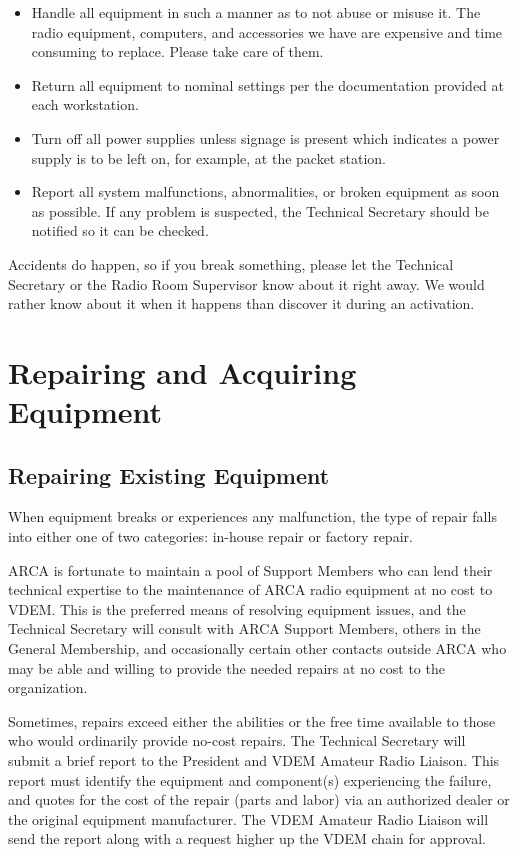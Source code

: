 \documentclass[pdflatex,letterpaper,twoside,12pt]{book}
\begin{document}
\begin{itemize}
	\item Handle all equipment in such a manner as to not abuse or misuse it.  The radio equipment, computers, and accessories we have are expensive and time consuming to replace.  Please take care of them.
	\item Return all equipment to nominal settings per the documentation provided at each workstation.
	\item Turn off all power supplies unless signage is present which indicates a power supply is to be left on, for example, at the packet station.
	\item Report all system malfunctions, abnormalities, or broken equipment as soon as possible.  If any problem is suspected, the Technical Secretary should be notified so it can be checked.
\end{itemize}

Accidents do happen, so if you break something, please let the Technical Secretary or the Radio Room Supervisor know about it right away.  We would rather know about it when it happens than discover it during an activation.

\section{Repairing and Acquiring Equipment}

\subsection{Repairing Existing Equipment}

When equipment breaks or experiences any malfunction, the type of repair falls into either one of two categories:  in-house repair or factory repair.

ARCA is fortunate to maintain a pool of Support Members who can lend their technical expertise to the maintenance of ARCA radio equipment at no cost to VDEM.  This is the preferred means of resolving equipment issues, and the Technical Secretary will consult with ARCA Support Members, others in the General Membership, and occasionally certain other contacts outside ARCA who may be able and willing to provide the needed repairs at no cost to the organization.

Sometimes, repairs exceed either the abilities or the free time available to those who would ordinarily provide no-cost repairs.  The Technical Secretary will submit a brief report to the President and VDEM Amateur Radio Liaison.  This report must identify the equipment and component(s) experiencing the failure, and quotes for the cost of the repair (parts and labor) via an authorized dealer or the original equipment manufacturer.  The VDEM Amateur Radio Liaison will send the report along with a request higher up the VDEM chain for approval.
\end{document}
